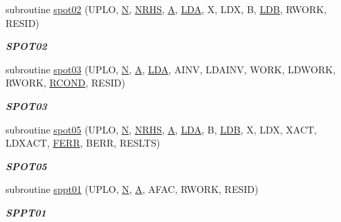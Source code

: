 \begin{DoxyCompactItemize}
subroutine \hyperlink{group__single__lin_gaa13d6defc68ae7325b00cd5478b9b01c}{spot02} (U\+P\+L\+O, \hyperlink{polmisc_8c_a0240ac851181b84ac374872dc5434ee4}{N}, \hyperlink{example__user_8c_aa0138da002ce2a90360df2f521eb3198}{N\+R\+H\+S}, \hyperlink{classA}{A}, \hyperlink{example__user_8c_ae946da542ce0db94dced19b2ecefd1aa}{L\+D\+A}, X, L\+D\+X, B, \hyperlink{example__user_8c_a50e90a7104df172b5a89a06c47fcca04}{L\+D\+B}, R\+W\+O\+R\+K, R\+E\+S\+I\+D)
\begin{DoxyCompactList}\small\item\em {\bfseries S\+P\+O\+T02} \end{DoxyCompactList}\item 
subroutine \hyperlink{group__single__lin_ga39a7c6e7426c6a3f502c7b0b87724f8e}{spot03} (U\+P\+L\+O, \hyperlink{polmisc_8c_a0240ac851181b84ac374872dc5434ee4}{N}, \hyperlink{classA}{A}, \hyperlink{example__user_8c_ae946da542ce0db94dced19b2ecefd1aa}{L\+D\+A}, A\+I\+N\+V, L\+D\+A\+I\+N\+V, W\+O\+R\+K, L\+D\+W\+O\+R\+K, R\+W\+O\+R\+K, \hyperlink{superlu__enum__consts_8h_af00a42ecad444bbda75cde1b64bd7e72a9b5c151728d8512307565994c89919d5}{R\+C\+O\+N\+D}, R\+E\+S\+I\+D)
\begin{DoxyCompactList}\small\item\em {\bfseries S\+P\+O\+T03} \end{DoxyCompactList}\item 
subroutine \hyperlink{group__single__lin_ga318ec45141c0b812b6d25a3943c23672}{spot05} (U\+P\+L\+O, \hyperlink{polmisc_8c_a0240ac851181b84ac374872dc5434ee4}{N}, \hyperlink{example__user_8c_aa0138da002ce2a90360df2f521eb3198}{N\+R\+H\+S}, \hyperlink{classA}{A}, \hyperlink{example__user_8c_ae946da542ce0db94dced19b2ecefd1aa}{L\+D\+A}, B, \hyperlink{example__user_8c_a50e90a7104df172b5a89a06c47fcca04}{L\+D\+B}, X, L\+D\+X, X\+A\+C\+T, L\+D\+X\+A\+C\+T, \hyperlink{superlu__enum__consts_8h_af00a42ecad444bbda75cde1b64bd7e72a78fd14d7abebae04095cfbe02928f153}{F\+E\+R\+R}, B\+E\+R\+R, R\+E\+S\+L\+T\+S)
\begin{DoxyCompactList}\small\item\em {\bfseries S\+P\+O\+T05} \end{DoxyCompactList}\item 
subroutine \hyperlink{group__single__lin_gad706097176870426bfe1dc60e3d759dd}{sppt01} (U\+P\+L\+O, \hyperlink{polmisc_8c_a0240ac851181b84ac374872dc5434ee4}{N}, \hyperlink{classA}{A}, A\+F\+A\+C, R\+W\+O\+R\+K, R\+E\+S\+I\+D)
\begin{DoxyCompactList}\small\item\em {\bfseries S\+P\+P\+T01} \end{DoxyCompactList}\item 

\end{DoxyCompactItemize}
